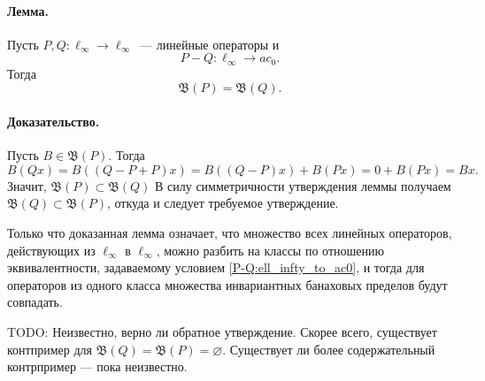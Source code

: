 \paragraph{Лемма.}

Пусть $P,Q:\ell_\infty \to \ell_\infty$~--- линейные операторы и
\begin{equation}\label{P-Q:ell_infty_to_ac0}
	P-Q : \ell_\infty \to ac_0
	.
\end{equation}
Тогда
\begin{equation}
	\mathfrak{B}(P)=\mathfrak{B}(Q)
	.
\end{equation}

\paragraph{Доказательство.}
Пусть $B\in \mathfrak{B}(P)$.
Тогда
\begin{equation}
	B(Qx) = B((Q-P+P)x) =
	B((Q-P)x)+B(Px) =
	0 + B(Px) =
	Bx
	.
\end{equation}
Значит, $\mathfrak{B}(P) \subset \mathfrak{B}(Q)$
В силу симметричности утверждения леммы получаем $\mathfrak{B}(Q) \subset \mathfrak{B}(P)$,
откуда и следует требуемое утверждение.

Только что доказанная лемма означает, что множество всех линейных операторов,
действующих из $\ell_\infty$ в $\ell_\infty$, можно разбить на классы по отношению эквивалентности,
задаваемому условием \eqref{P-Q:ell_infty_to_ac0},
и тогда для операторов из одного класса множества инвариантных банаховых пределов будут совпадать.

TODO:
Неизвестно, верно ли обратное утверждение.
Скорее всего, существует контпример для $\mathfrak{B}(Q) = \mathfrak{B}(P) = \varnothing$.
Существует ли более содержательный контрпример --- пока неизвестно.

